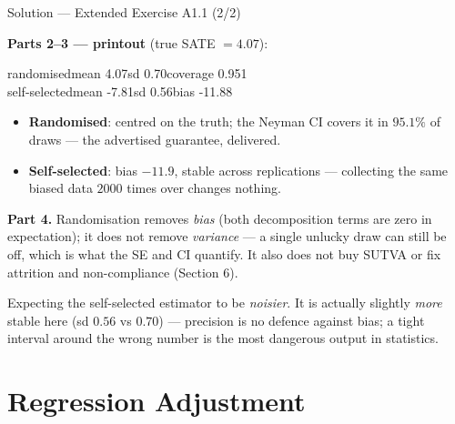 \documentclass[aspectratio=169,11pt]{beamer}
\begin{document}
\begin{frame}{Solution --- Extended Exercise A1.1 (2/2)}
\begin{solutionbox}
  \fontsize{7}{8.4}\selectfont
  \textbf{Parts 2--3 --- printout} (true SATE $= 4.07$):
  \begin{center}\ttfamily
  randomised\quad mean 4.07\quad sd 0.70\quad coverage 0.951\\[2pt]
  self-selected\quad mean -7.81\quad sd 0.56\quad bias -11.88
  \end{center}
  \begin{itemize}
    \item \textbf{Randomised}: centred on the truth; the Neyman CI covers it in
          $95.1\%$ of draws --- the advertised guarantee, delivered.
    \item \textbf{Self-selected}: bias $-11.9$, stable across replications ---
          collecting the same biased data $2000$ times over changes nothing.
  \end{itemize}
  \textbf{Part 4.} Randomisation removes \emph{bias} (both decomposition terms are zero
  in expectation); it does not remove \emph{variance} --- a single unlucky draw can still
  be off, which is what the SE and CI quantify. It also does not buy SUTVA or fix
  attrition and non-compliance (Section 6).
\end{solutionbox}
\begin{mistake}
  \scriptsize
  Expecting the self-selected estimator to be \emph{noisier}. It is actually slightly
  \emph{more} stable here (sd $0.56$ vs $0.70$) --- precision is no defence against bias;
  a tight interval around the wrong number is the most dangerous output in statistics.
\end{mistake}
\end{frame}

\section{Regression Adjustment}
\end{document}
